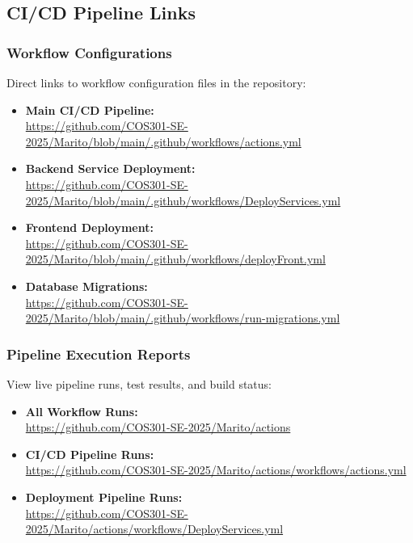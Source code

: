 \documentclass[12pt,a4paper]{article}
\begin{document}
\subsection{CI/CD Pipeline Links}

\subsubsection{Workflow Configurations}
Direct links to workflow configuration files in the repository:

\begin{itemize}
    \item \textbf{Main CI/CD Pipeline:} \\
    \url{https://github.com/COS301-SE-2025/Marito/blob/main/.github/workflows/actions.yml}
    
    \item \textbf{Backend Service Deployment:} \\
    \url{https://github.com/COS301-SE-2025/Marito/blob/main/.github/workflows/DeployServices.yml}
    
    \item \textbf{Frontend Deployment:} \\
    \url{https://github.com/COS301-SE-2025/Marito/blob/main/.github/workflows/deployFront.yml}
    
    \item \textbf{Database Migrations:} \\
    \url{https://github.com/COS301-SE-2025/Marito/blob/main/.github/workflows/run-migrations.yml}
\end{itemize}

\subsubsection{Pipeline Execution Reports}
View live pipeline runs, test results, and build status:

\begin{itemize}
    \item \textbf{All Workflow Runs:} \\
    \url{https://github.com/COS301-SE-2025/Marito/actions}
    
    \item \textbf{CI/CD Pipeline Runs:} \\
    \url{https://github.com/COS301-SE-2025/Marito/actions/workflows/actions.yml}
    
    \item \textbf{Deployment Pipeline Runs:} \\
    \url{https://github.com/COS301-SE-2025/Marito/actions/workflows/DeployServices.yml}
\end{itemize}
\end{document}
